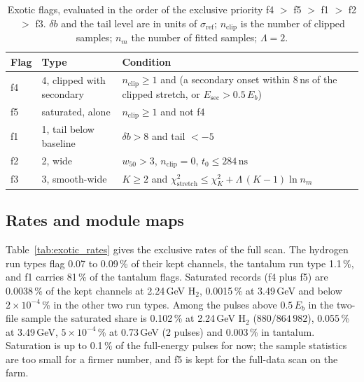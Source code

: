 \documentclass[11pt]{article}
\newcommand{\ns}{\,\mathrm{ns}}
\begin{document}
\begin{table}[htbp]
\centering
\caption{Exotic flags, evaluated in the order of the exclusive priority f4 $>$ f5 $>$ f1 $>$ f2 $>$ f3. $\delta b$ and the tail level are in units of $\sigma_{\mathrm{ref}}$; $n_{\mathrm{clip}}$ is the number of clipped samples; $n_m$ the number of fitted samples; $\Lambda = 2$.}
\label{tab:exotic_flags}
\small
\begin{tabular}{llp{}}
\toprule
Flag & Type & Condition \\
\midrule
f4 & 4, clipped with secondary & $n_{\mathrm{clip}} \ge 1$ and (a secondary onset within 8\,ns of the clipped stretch, or $E_{\mathrm{sec}} > 0.5\,E_b$) \\
f5 & saturated, alone & $n_{\mathrm{clip}} \ge 1$ and not f4 \\
f1 & 1, tail below baseline & $\delta b > 8$ and tail $< -5$ \\
f2 & 2, wide & $w_{50} > 3$, $n_{\mathrm{clip}} = 0$, $t_0 \le 284\ns$ \\
f3 & 3, smooth-wide & $K \ge 2$ and $\chi^2_{\mathrm{stretch}} \le \chi^2_K + \Lambda\,(K - 1)\ln n_m$ \\
\bottomrule
\end{tabular}
\end{table}

\subsection{Rates and module maps}
\label{sec:exotic_rates}

Table~\ref{tab:exotic_rates} gives the exclusive rates of the full scan. The hydrogen run types flag 0.07 to 0.09\,\% of their kept channels, the tantalum run type 1.1\,\%, and f1 carries 81\,\% of the tantalum flags. Saturated records (f4 plus f5) are 0.0038\,\% of the kept channels at 2.24\,GeV H$_2$, 0.0015\,\% at 3.49\,GeV and below $2 \times 10^{-4}$\,\% in the other two run types. Among the pulses above $0.5\,E_b$ in the two-file sample the saturated share is 0.102\,\% at 2.24\,GeV H$_2$ ($880/864\,982$), 0.055\,\% at 3.49\,GeV, $5 \times 10^{-4}$\,\% at 0.73\,GeV (2 pulses) and 0.003\,\% in tantalum. Saturation is up to 0.1\,\% of the full-energy pulses for now; the sample statistics are too small for a firmer number, and f5 is kept for the full-data scan on the farm.
\end{document}
